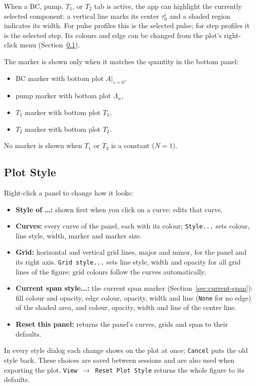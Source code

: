 \documentclass[12pt,a4paper]{article}
\newcommand{\menu}[1]{\texttt{#1}}
\begin{document}
When a BC, pump, $T_1$, or $T_2$ tab is active, the app can highlight the
currently selected component: a vertical line marks its center $\tau_0^i$
and a shaded region indicates its width. For pulse profiles this is the
selected pulse; for step profiles it is the selected step.
Its colours and edge can be changed from the plot's right-click menu
(Section~\ref{sec:plot-style}).

The marker is shown only when it matches the quantity in the bottom panel:
\begin{itemize}[noitemsep]
  \item BC marker with bottom plot $A\vert_{z=0}$,
  \item pump marker with bottom plot $\Lambda_n$,
  \item $T_1$ marker with bottom plot $T_1$,
  \item $T_2$ marker with bottom plot $T_2$.
\end{itemize}
No marker is shown when $T_1$ or $T_2$ is a constant ($N = 1$).

\subsection{Plot Style}\label{sec:plot-style}

Right-click a panel to change how it looks:
\begin{itemize}[noitemsep]
  \item \textbf{Style of \ldots:} shown first when you click on a curve; edits that curve.
  \item \textbf{Curves:} every curve of the panel, each with its colour; \menu{Style...} sets
  colour, line style, width, marker and marker size.
  \item \textbf{Grid:} horizontal and vertical grid lines, major and minor, for the panel and its
  right axis. \menu{Grid style...} sets line style, width and opacity for all grid lines of the
  figure; grid colours follow the curves automatically.
  \item \textbf{Current span style...:} the current span marker
  (Section~\ref{sec:current-span}): fill colour and opacity, edge colour, opacity, width and
  line (\menu{None} for no edge) of the shaded area, and colour, opacity, width and line of
  the centre line.
  \item \textbf{Reset this panel:} returns the panel's curves, grids and span to their defaults.
\end{itemize}
In every style dialog each change shows on the plot at once; \menu{Cancel} puts the old
style back. These choices are saved between sessions and are also used when exporting the plot.
\menu{View $\to$ Reset Plot Style} returns the whole figure to its defaults.
\end{document}
